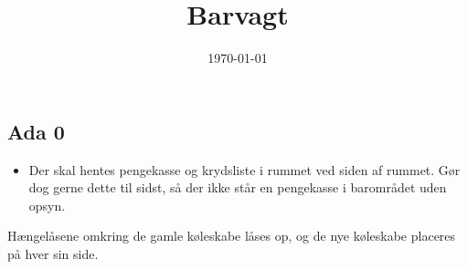 

\title{Barvagt}
\date{\today}



\maketitle

\tableofcontents

\vspace{0.4cm}


\subsection{Ada 0}
\label{sec:pre:ada}

\begin{itemize}
\item Der skal hentes pengekasse og krydsliste i rummet ved siden af
  rummet. Gør dog gerne dette til sidst, så der ikke står en
  pengekasse i barområdet uden opsyn.
\end{itemize}
\item Hængelåsene omkring de gamle køleskabe låses op, og de nye køleskabe placeres på hver sin side.




